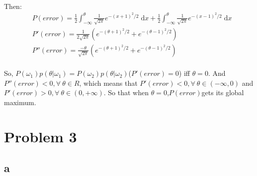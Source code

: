 \documentclass[]{article}
\begin{document}
            \paragraph{} Then:
            \begin{align*}
                &P(error) = \frac{1}{2}\int_{-\infty}^{\theta} \frac{1}{\sqrt{2\pi}}e^{-(x+1)^2/2}  \; \mathrm{d}x 
                              + \frac{1}{2}\int_{-\infty}^{\theta} \frac{1}{\sqrt{2\pi}}e^{-(x-1)^2/2}  \; \mathrm{d}x \\
                &P'(error) =  \frac{1}{2\sqrt{2\pi}}(e^{-(\theta+1)^2/2}+e^{-(\theta-1)^2/2}) \\
                &P''(error) = \frac{-\theta}{\sqrt{2\pi}}(e^{-(\theta+1)^2/2}+e^{-(\theta-1)^2/2})
            \end{align*}
            \paragraph{}So, $P(\omega_1) p(\theta|\omega_1)= P(\omega_2) p(\theta|\omega_2)$($P'(error) = 0$) iff $\theta = 0$.
             And $P''(error)<0, \forall \: \theta \in R$,
             which means that $P'(error) < 0, \forall \: \theta \in (-\infty,0)$ and $P'(error) > 0, \forall \: \theta \in (0,+\infty)$. So that when $\theta = 0$,$P(error)$gets its global maximum.
    \section{Problem 3}
        \subsection{a}
\end{document}
